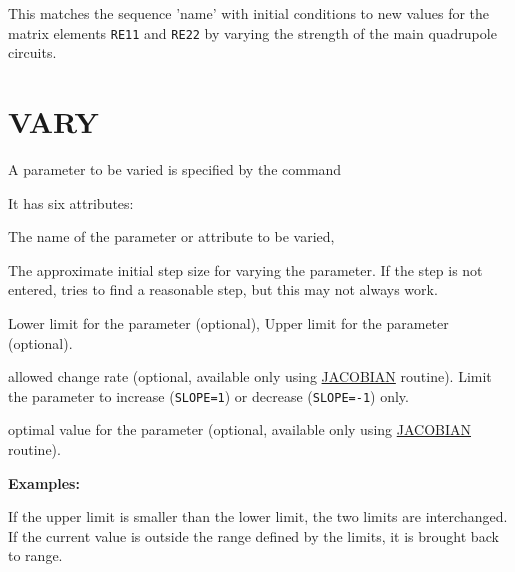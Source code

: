 This matches the sequence 'name' with initial conditions to new values
for the matrix elements {\tt RE11} and {\tt RE22} by varying the
strength of the main quadrupole circuits.




%
 
\section{VARY}
\label{sec:vary}
A parameter to be varied is specified by the command 


It has six attributes: 
\begin{madlist}
   The name of the parameter or attribute to be varied,  

   The approximate initial step size for varying the
  parameter. If the step is not entered, \madx tries to find a
  reasonable step, but this may not always work.  

   Lower limit for the parameter (optional), 
   Upper limit for the parameter (optional). 

   allowed change rate (optional, available only using
  \hyperref[subsec:match-jacobian]{JACOBIAN} routine). Limit the
  parameter to increase ({\tt SLOPE=1}) or decrease ({\tt SLOPE=-1}) only.

   optimal value for the parameter (optional, available
  only using \hyperref[subsec:match-jacobian]{JACOBIAN} routine).  
\end{madlist}

{\bf Examples:}

If the upper limit is smaller than the lower limit, the two limits are
interchanged. If the current value is outside the range defined by the
limits, it is brought back to range. 

